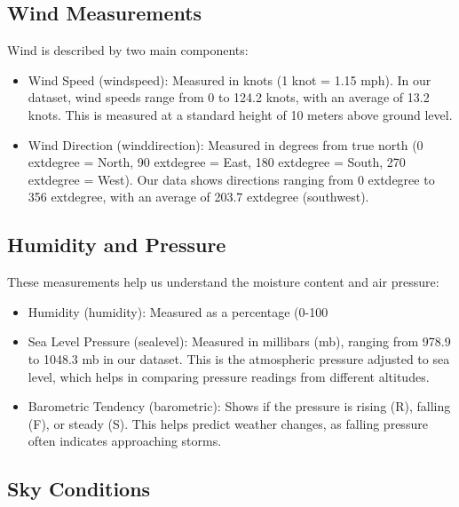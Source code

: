 \subsection{Wind Measurements}
Wind is described by two main components:\begin{itemize}
  \item Wind Speed (windspeed): Measured in knots (1 knot = 1.15 mph). In our dataset, wind speeds range from 0 to 124.2 knots, with an average of 13.2 knots. This is measured at a standard height of 10 meters above ground level.
  \item Wind Direction (winddirection): Measured in degrees from true north (0	extdegree = North, 90	extdegree = East, 180	extdegree = South, 270	extdegree = West). Our data shows directions ranging from 0	extdegree to 356	extdegree, with an average of 203.7	extdegree (southwest).
\end{itemize}

\subsection{Humidity and Pressure}
These measurements help us understand the moisture content and air pressure:\begin{itemize}
  \item Humidity (humidity): Measured as a percentage (0-100%
  \item Sea Level Pressure (sealevel): Measured in millibars (mb), ranging from 978.9 to 1048.3 mb in our dataset. This is the atmospheric pressure adjusted to sea level, which helps in comparing pressure readings from different altitudes.
  \item Barometric Tendency (barometric): Shows if the pressure is rising (R), falling (F), or steady (S). This helps predict weather changes, as falling pressure often indicates approaching storms.
\end{itemize}


\subsection{Sky Conditions}
